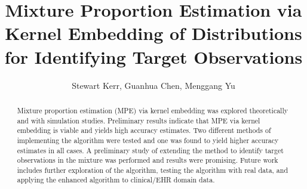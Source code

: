 \documentclass[lineno]{biometrika}
\begin{document}
\title{Mixture Proportion Estimation via Kernel Embedding of Distributions for Identifying Target Observations}

\author{Stewart Kerr, Guanhua Chen, Menggang Yu}

\maketitle

\begin{abstract}
Mixture proportion estimation (MPE) via kernel embedding was explored theoretically and with simulation studies. Preliminary results indicate that MPE via kernel embedding is viable and yields high accuracy estimates. Two different methods of implementing the algorithm were tested and one was found to yield higher accuracy estimates in all cases. A preliminary study of extending the method to identify target observations in the mixture was performed and results were promising. Future work includes further exploration of the algorithm, testing the algorithm with real data, and applying the enhanced algorithm to clinical/EHR domain data.
\end{abstract}
\end{document}
